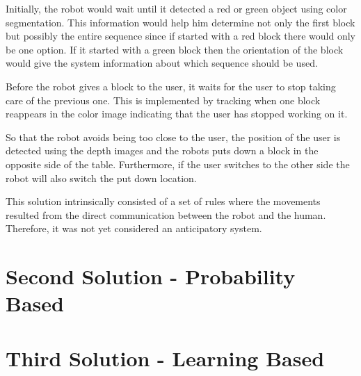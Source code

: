 Initially, the robot would wait until it detected a red or green object using color segmentation. This information would help him determine not only the first block but possibly the entire sequence since if started with a red block there would only be one option. If it started with a green block then the orientation of the block would give the system information about which sequence should be used.

Before the robot gives a block to the user, it waits for the user to stop taking care of the previous one. This is implemented by tracking when one block reappears in the color image indicating that the user has stopped working on it.

So that the robot avoids being too close to the user, the position of the user is detected using the depth images and the robots puts down a block in the opposite side of the table. Furthermore, if the user switches to the other side the robot will also switch the put down location.
\fi

This solution intrinsically consisted of a set of rules where the movements resulted from the direct communication between the robot and the human. Therefore, it was not yet considered an anticipatory system.

\section{Second Solution - Probability Based}

\section{Third Solution - Learning Based}